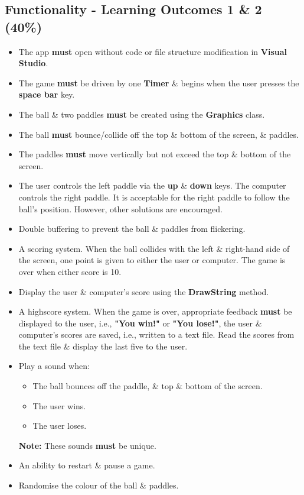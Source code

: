 \documentclass{article}
\begin{document}
\subsection*{Functionality - Learning Outcomes 1 \& 2 (40\%)}
\begin{itemize}
    \item The app \textbf{must} open without code or file structure modification in \textbf{Visual Studio}.
    \item The game \textbf{must} be driven by one \textbf{Timer} \& begins when the user presses the \textbf{space bar} key.
    \item The ball \& two paddles \textbf{must} be created using the \textbf{Graphics} class. 
    \item The ball \textbf{must} bounce/collide off the top \& bottom of the screen, \& paddles.
    \item The paddles \textbf{must} move vertically but not exceed the top \& bottom of the screen.
    \item The user controls the left paddle via the \textbf{up} \& \textbf{down} keys. The computer controls the right paddle. It is acceptable for the right paddle to follow the ball's position. However, other solutions are encouraged.
    \item Double buffering to prevent the ball \& paddles from flickering.
    \item A scoring system. When the ball collides with the left \& right-hand side of the screen, one point is given to either the user or computer. The game is over when either score is 10. 
    \item Display the user \& computer's score using the \textbf{DrawString} method.
    \item A highscore system. When the game is over, appropriate feedback \textbf{must} be displayed to the user, i.e., \textbf{"You win!"} or \textbf{"You lose!"}, the user \& computer's scores are saved, i.e., written to a text file. Read the scores from the text file \& display the last five to the user.
    \item Play a sound when:
    \begin{itemize}
        \item The ball bounces off the paddle, \& top \& bottom of the screen.
        \item The user wins.
        \item The user loses.
    \end{itemize}
    \textbf{Note:} These sounds \textbf{must} be unique.
    \item An ability to restart \& pause a game.
    \item Randomise the colour of the ball \& paddles.
\end{itemize}
\end{document}
